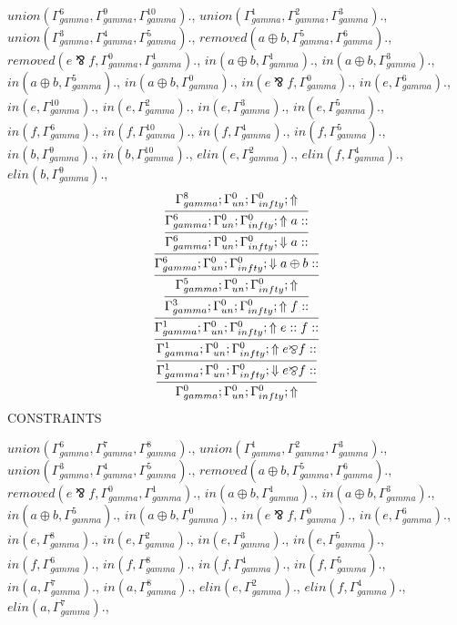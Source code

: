 \documentclass[a4paper, 11pt]{article}
\begin{document}
$union(\Gamma_{gamma}^{6}, \Gamma_{gamma}^{9}, \Gamma_{gamma}^{10}).$, $union(\Gamma_{gamma}^{1}, \Gamma_{gamma}^{2}, \Gamma_{gamma}^{3}).$, $union(\Gamma_{gamma}^{3}, \Gamma_{gamma}^{4}, \Gamma_{gamma}^{5}).$, $removed(a \oplus b, \Gamma_{gamma}^{5}, \Gamma_{gamma}^{6}).$, $removed(e \bindnasrepma f, \Gamma_{gamma}^{0}, \Gamma_{gamma}^{1}).$, $in(a \oplus b, \Gamma_{gamma}^{1}).$, $in(a \oplus b, \Gamma_{gamma}^{3}).$, $in(a \oplus b, \Gamma_{gamma}^{5}).$, $in(a \oplus b, \Gamma_{gamma}^{0}).$, $in(e \bindnasrepma f, \Gamma_{gamma}^{0}).$, $in(e, \Gamma_{gamma}^{6}).$, $in(e, \Gamma_{gamma}^{10}).$, $in(e, \Gamma_{gamma}^{2}).$, $in(e, \Gamma_{gamma}^{3}).$, $in(e, \Gamma_{gamma}^{5}).$, $in(f, \Gamma_{gamma}^{6}).$, $in(f, \Gamma_{gamma}^{10}).$, $in(f, \Gamma_{gamma}^{4}).$, $in(f, \Gamma_{gamma}^{5}).$, $in(b, \Gamma_{gamma}^{9}).$, $in(b, \Gamma_{gamma}^{10}).$, $elin(e, \Gamma_{gamma}^{2}).$, $elin(f, \Gamma_{gamma}^{4}).$, $elin(b, \Gamma_{gamma}^{9}).$, 
\[
\infer{\Gamma_{ gamma}^{0} ; \Gamma_{un}^{0} ; \Gamma_{ infty}^{0} ;  \Uparrow }
{\infer{\Gamma_{ gamma}^{1} ; \Gamma_{un}^{0} ; \Gamma_{ infty}^{0} ;  \Downarrow e \bindnasrepma f :: }
{\infer{\Gamma_{ gamma}^{1} ; \Gamma_{un}^{0} ; \Gamma_{ infty}^{0} ;  \Uparrow e \bindnasrepma f :: }
{\infer{\Gamma_{ gamma}^{1} ; \Gamma_{un}^{0} ; \Gamma_{ infty}^{0} ;  \Uparrow e :: f :: }
{\infer{\Gamma_{ gamma}^{3} ; \Gamma_{un}^{0} ; \Gamma_{ infty}^{0} ;  \Uparrow f :: }
{\infer{\Gamma_{ gamma}^{5} ; \Gamma_{un}^{0} ; \Gamma_{ infty}^{0} ;  \Uparrow }
{\infer{\Gamma_{ gamma}^{6} ; \Gamma_{un}^{0} ; \Gamma_{ infty}^{0} ;  \Downarrow a \oplus b :: }
{\infer{\Gamma_{ gamma}^{6} ; \Gamma_{un}^{0} ; \Gamma_{ infty}^{0} ;  \Downarrow a :: }
{\infer{\Gamma_{ gamma}^{6} ; \Gamma_{un}^{0} ; \Gamma_{ infty}^{0} ;  \Uparrow a :: }
{\Gamma_{ gamma}^{8} ; \Gamma_{un}^{0} ; \Gamma_{ infty}^{0} ;  \Uparrow }}}}}}}}}
\]
CONSTRAINTS

$union(\Gamma_{gamma}^{6}, \Gamma_{gamma}^{7}, \Gamma_{gamma}^{8}).$, $union(\Gamma_{gamma}^{1}, \Gamma_{gamma}^{2}, \Gamma_{gamma}^{3}).$, $union(\Gamma_{gamma}^{3}, \Gamma_{gamma}^{4}, \Gamma_{gamma}^{5}).$, $removed(a \oplus b, \Gamma_{gamma}^{5}, \Gamma_{gamma}^{6}).$, $removed(e \bindnasrepma f, \Gamma_{gamma}^{0}, \Gamma_{gamma}^{1}).$, $in(a \oplus b, \Gamma_{gamma}^{1}).$, $in(a \oplus b, \Gamma_{gamma}^{3}).$, $in(a \oplus b, \Gamma_{gamma}^{5}).$, $in(a \oplus b, \Gamma_{gamma}^{0}).$, $in(e \bindnasrepma f, \Gamma_{gamma}^{0}).$, $in(e, \Gamma_{gamma}^{6}).$, $in(e, \Gamma_{gamma}^{8}).$, $in(e, \Gamma_{gamma}^{2}).$, $in(e, \Gamma_{gamma}^{3}).$, $in(e, \Gamma_{gamma}^{5}).$, $in(f, \Gamma_{gamma}^{6}).$, $in(f, \Gamma_{gamma}^{8}).$, $in(f, \Gamma_{gamma}^{4}).$, $in(f, \Gamma_{gamma}^{5}).$, $in(a, \Gamma_{gamma}^{7}).$, $in(a, \Gamma_{gamma}^{8}).$, $elin(e, \Gamma_{gamma}^{2}).$, $elin(f, \Gamma_{gamma}^{4}).$, $elin(a, \Gamma_{gamma}^{7}).$, 
\end{document}
